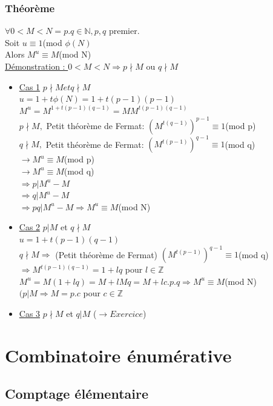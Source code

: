 \documentclass[11pt]{article}
\begin{document}
\begin{itemize}
					\subsubsection{Théorème}
						$\forall 0 < M < N = p.q \in \mathbb{N}, p, q$ premier.\\
						Soit $u \equiv 1$(mod $\phi(N)$\\
						Alors $M^u \equiv M$(mod N)\\
						\underline{Démonstration : } $0 < M < N \Rightarrow p \nmid M$ ou $q \nmid M$
						\begin{itemize}
				 \item \underline{Cas 1} $p \nmid M et q \nmid M$\\
					$u = 1 + t \phi(N) = 1 + t (p-1)(p-1)$\\
					$M^u = M^{1+t(p-1)(q-1)}= M M^{t(p-1)(q-1)}$\\
					$p \nmid M,$ Petit théorème de Fermat: $(M^{t(q-1)})^{p-1} \equiv 1$(mod p)\\
					$q \nmid M,$ Petit théorème de Fermat: $(M^{t(p-1)})^{q-1} \equiv 1$(mod q)\\
					$\rightarrow M^u \equiv M$(mod p) \\
					$\rightarrow M^u \equiv M$(mod q) \\
					$\Rightarrow p | M^u - M$ \\
					$\Rightarrow q | M^u - M$ \\
					$\Rightarrow pq | M^u - M \Rightarrow M^u \equiv M$(mod N)
				 \item \underline{Cas 2} $p | M$ et $q \nmid M$\\
					$u = 1+t (p-1)(q-1)$\\
					$q \nmid M \Rightarrow$ (Petit théorème de Fermat) $(M^{t(p-1)})^{q-1} \equiv 1$(mod q) \\
					$\Rightarrow M^{t(p-1)(q-1)} = 1 + lq$ pour $l \in \mathbb{Z}$ \\
					$M^u = M(1+lq)=M + lMq = M+lc.p.q \Rightarrow M^u \equiv M$(mod N)\\
					$(p|M \Rightarrow M = p.c$ pour $c \in \mathbb{Z}$
				 \item \underline{Cas 3} $p \nmid M$ et $q | M$ ($\rightarrow Exercice$)
				\end{itemize}	
			\end{itemize}

\section{Combinatoire énumérative}
	\subsection{Comptage élémentaire}
		
\end{document}
